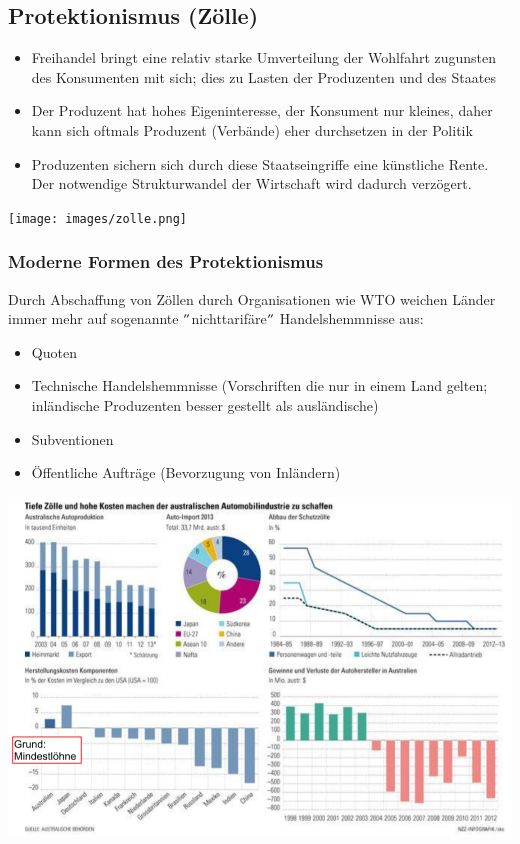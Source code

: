 \subsection{Protektionismus (Zölle)}
\begin{minipage}{0.35\linewidth}
	\begin{itemize}
		\item Freihandel bringt eine relativ starke Umverteilung der Wohlfahrt zugunsten des Konsumenten mit sich; dies zu Lasten der Produzenten und des Staates
		\item Der Produzent hat hohes Eigeninteresse, der Konsument nur kleines, daher kann sich oftmals Produzent (Verbände) eher durchsetzen in der Politik
		\item Produzenten sichern sich durch diese Staatseingriffe eine künstliche Rente. Der notwendige Strukturwandel der Wirtschaft wird dadurch verzögert.
	\end{itemize}
\end{minipage}
\begin{minipage}{0.6\linewidth}
		\texttt{[image: images/zolle.png]}
\end{minipage}

\subsubsection{Moderne Formen des Protektionismus}
\begin{minipage}{0.35\linewidth}
	Durch Abschaffung von Zöllen durch Organisationen wie WTO weichen Länder immer mehr auf sogenannte $"$nichttarifäre$"$ Handelshemmnisse aus:
\begin{itemize}
	\item Quoten
	\item Technische Handelshemmnisse (Vorschriften die nur in einem Land gelten; inländische Produzenten besser gestellt als ausländische)
	\item Subventionen
	\item Öffentliche Aufträge (Bevorzugung von Inländern)
\end{itemize}
\end{minipage}
\begin{minipage}{0.6\linewidth}
	\includegraphics[width=\linewidth]{images/australien.png}
\end{minipage}

